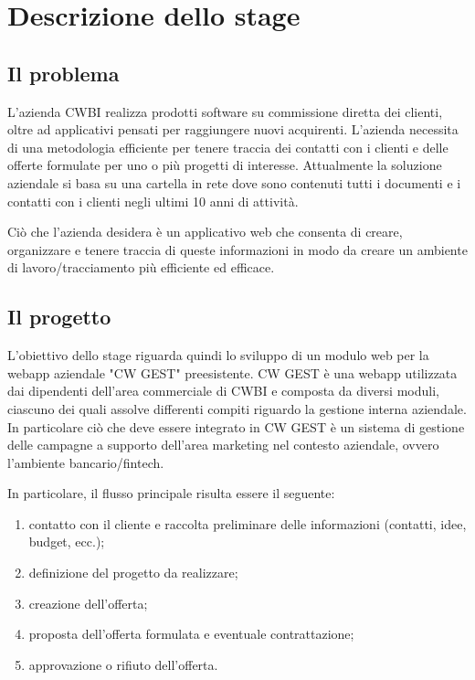 \chapter{Descrizione dello stage}
\label{cap:descrizione-stage}


\setlength{\parskip}{3ex}

\section{Il problema}
L'azienda CWBI realizza prodotti software su commissione diretta dei clienti, oltre ad applicativi pensati per raggiungere nuovi acquirenti. L'azienda necessita di una metodologia efficiente per tenere traccia dei contatti con i clienti e delle offerte formulate per uno o più  progetti di interesse. Attualmente la soluzione aziendale si basa su una cartella in rete dove sono contenuti tutti i documenti e i contatti con i clienti negli ultimi 10 anni di attività.

\setlength{\parskip}{3ex}

\noindent Ciò che l'azienda desidera è un applicativo web che consenta di creare, organizzare e tenere traccia di queste informazioni in modo da creare un ambiente di lavoro/tracciamento più efficiente ed efficace. 

\section{Il progetto}
L'obiettivo dello stage riguarda quindi lo sviluppo di un modulo web per la webapp aziendale "CW GEST" preesistente. CW GEST è una webapp utilizzata dai dipendenti dell'area commerciale di CWBI e composta da diversi moduli, ciascuno dei quali assolve differenti compiti riguardo la gestione interna aziendale. In particolare ciò che deve essere integrato in CW GEST è un sistema di gestione delle campagne a supporto dell'area marketing nel contesto aziendale, ovvero l'ambiente bancario/fintech. 

\setlength{\parskip}{3ex}

\noindent In particolare, il flusso principale risulta essere il seguente:
\begin{enumerate}
\item contatto con il cliente e raccolta preliminare delle informazioni (contatti, idee, budget, ecc.);
\item definizione del progetto da realizzare;
\item creazione dell'offerta;
\item proposta dell'offerta formulata e eventuale contrattazione;
\item approvazione o rifiuto dell'offerta.
\end{enumerate}

